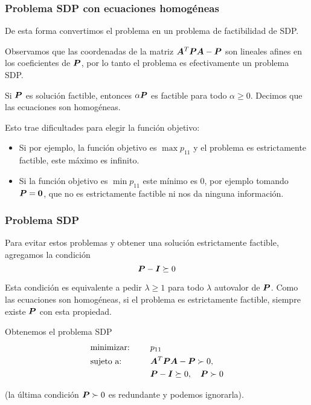 \documentclass[aspectratio=169,12pt,spanish]{beamer}
\begin{document}

\begin{frame}
\frametitle{Problema SDP con ecuaciones homogéneas}

De esta forma convertimos el problema en un problema de factibilidad de SDP.

Observamos que las coordenadas de la matriz $\bm{A}^T \bm{P} \bm{A} - \bm{P}$ son lineales afines en los coeficientes de $\bm{P}$, por lo tanto el problema es efectivamente un problema SDP.

Si $\bm{P}$ es solución factible, entonces $\alpha \bm{P}$ es factible para todo $\alpha \ge 0$. Decimos que las ecuaciones son homogéneas.

Esto trae dificultades para elegir la función objetivo:
\begin{itemize}
\item Si por ejemplo, la función objetivo es $\max p_{11}$ y el problema es estrictamente factible, este máximo es infinito.
\item Si la función objetivo es $\min p_{11}$ este mínimo es 0, por ejemplo tomando $\bm{P} = \bm{0}$, que no es estrictamente factible ni nos da ninguna información.
\end{itemize}

\end{frame}


\begin{frame}
\frametitle{Problema SDP}

Para evitar estos problemas y obtener una solución estrictamente factible, agregamos la condición
$$
\bm{P} - \bm{I} \succeq 0
$$

Esta condición es equivalente a pedir $\lambda \ge 1$ para todo $\lambda$ autovalor de $\bm{P}$. Como las ecuaciones son homogéneas, si el problema es estrictamente factible, siempre existe $\bm{P}$ con esta propiedad.

Obtenemos el problema SDP
\begin{alignat*}{2}
  & \text{minimizar: } & & p_{11} \\
   & \text{sujeto a: } & \quad & \bm{A}^T \bm{P} \bm{A} - \bm{P} \succ 0, \\
   &&& \bm{P} - \bm{I} \succeq 0, \quad \bm{P} \succ 0
\end{alignat*}

(la última condición $\bm{P} \succ 0$ es redundante y podemos ignorarla).

\end{frame}
\end{document}
